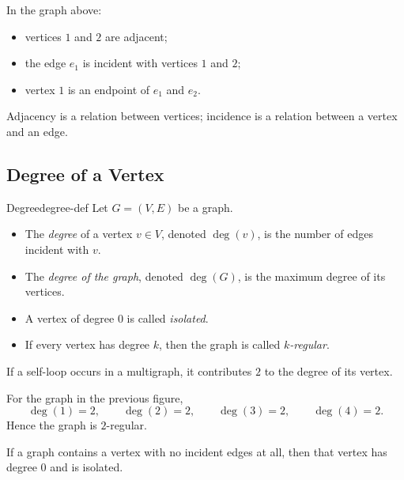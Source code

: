 \begin{examplebox}[title={Reading adjacency and incidence from a graph}]
In the graph above:
\begin{itemize}[leftmargin=*]
    \item vertices \(1\) and \(2\) are adjacent;
    \item the edge \(e_1\) is incident with vertices \(1\) and \(2\);
    \item vertex \(1\) is an endpoint of \(e_1\) and \(e_2\).
\end{itemize}
Adjacency is a relation between vertices; incidence is a relation between a vertex and an edge.
\end{examplebox}

\subsection{Degree of a Vertex}

\begin{definition}{Degree}{degree-def}
Let \(G=(V,E)\) be a graph.
\begin{itemize}[leftmargin=*]
    \item The \emph{degree} of a vertex \(v\in V\), denoted \(\deg(v)\), is the number of edges incident with \(v\).
    \item The \emph{degree of the graph}, denoted \(\deg(G)\), is the maximum degree of its vertices.
    \item A vertex of degree \(0\) is called \emph{isolated}.
    \item If every vertex has degree \(k\), then the graph is called \emph{\(k\)-regular}.
\end{itemize}
If a self-loop occurs in a multigraph, it contributes \(2\) to the degree of its vertex.
\end{definition}

\begin{examplebox}[title={Degrees in the displayed graph}]
For the graph in the previous figure,
\[
\deg(1)=2,\qquad \deg(2)=2,\qquad \deg(3)=2,\qquad \deg(4)=2.
\]
Hence the graph is \(2\)-regular.
\end{examplebox}

\begin{examplebox}[title={An isolated vertex}]
If a graph contains a vertex with no incident edges at all, then that vertex has degree \(0\) and is isolated.
\end{examplebox}

